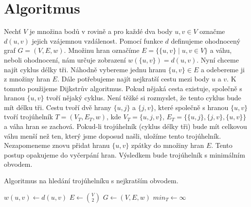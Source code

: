 \section{Algoritmus}
\label{sec:algoritmus}

Nechť $V$ je množina bodů v rovině a pro každé dva body $u, v \in V$ označme $d(u, v)$ jejich vzájemnou vzdálenost. Pomocí funkce $d$ definujeme ohodnocený graf $G = (V, E, w)$. Množinu hran označíme $E = \{\{u, v\} \mid u, v \in V\}$ a váhu, neboli ohodnocení, nám určuje zobrazení $w(\{u, v\}) = d(u, v)$. Nyní chceme najít cyklus délky tři. Náhodně vybereme jednu hranu $\{u, v\} \in E$ a odebereme ji z množiny hran $E$. Dále potřebujeme najít nejkratší cestu mezi body $u$ a  $v$. K tomuto použijeme Dijkstrův algoritmus. Pokud nějaká cesta existuje, společně s hranou $\{u, v\}$ tvoří nějaký cyklus. Není těžké si rozmyslet, že tento cyklus bude mít délku tři. Cestu tvoří dvě hrany $\{u, j\}$ a $\{j, v\}$, které společně s hranou $\{u, v\}$ tvoří trojúhelník $T = (V_T, E_T, w)$, kde $V_T = \{u, j, v\}$, $E_T = \{\{u,j\}, \{j,v\}, \{u,v\}\}$ a váha hran se zachová. Pokud-li trojúhelník (cyklus délky tři) bude mít celkovou váhu menší než ten, který jsme doposud našli, uložíme tento trojúhelník.
Nezapomeneme znovu přidat hranu $\{u, v\}$ zpátky do množiny hran $E$. Tento postup opakujeme do vyčerpání hran. Výsledkem bude trojúhelník s minimálním obvodem.

\begin{algorithm}
    \caption{Algoritmus na hledání trojúhelníku s nejkratším obvodem.}
    \label{alg:algoritmus}
   
   
    \BlankLine
    $ w({u, v}) \leftarrow d(u, v)$\;
    $ E \leftarrow{\binom{V}{2}}$\;
    $ G \leftarrow (V, E, w)$\;
    $min_T \leftarrow \infty$\;
    \;
   \end{algorithm}